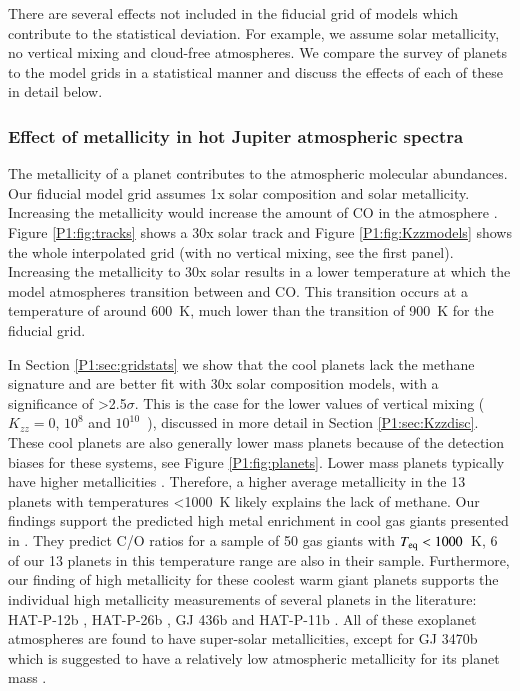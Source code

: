 There are several effects not included in the fiducial grid of models which contribute to the statistical deviation. For example, we assume solar metallicity, no vertical mixing and cloud-free atmospheres. We compare the survey of planets to the model grids in a statistical manner and discuss the effects of each of these in detail below.

\subsubsection{Effect of metallicity in hot Jupiter atmospheric spectra}
\label{P1:sec:metallicitydisc}

The metallicity of a planet contributes to the atmospheric molecular abundances. Our fiducial model grid assumes 1x solar composition and solar metallicity. Increasing the metallicity would increase the amount of CO in the atmosphere \citep[e.g.,][]{Venot2014}. Figure \ref{P1:fig:tracks} shows a 30x solar track and Figure \ref{P1:fig:Kzzmodels} shows the whole interpolated grid (with no vertical mixing, see the first panel). Increasing the metallicity to 30x solar results in a lower temperature at which the model atmospheres transition between  and CO. This transition occurs at a temperature of around 600~K, much lower than the transition of 900~K for the fiducial grid.

In Section \ref{P1:sec:gridstats} we show that the cool planets lack the methane signature and are better fit with 30x solar composition models, with a significance of >2.5$\sigma$. This is the case for the lower values of vertical mixing ($K_{zz} = 0$,  $10^8$ and $10^{10}$~\cmcms), discussed in more detail in Section \ref{P1:sec:Kzzdisc}. These cool planets are also generally lower mass planets because of the detection biases for these systems, see Figure \ref{P1:fig:planets}. Lower mass planets typically have higher metallicities \cite{Fortney2013, Welbanks2019}. Therefore, a higher average metallicity in the 13 planets with temperatures <1000~K likely explains the lack of methane. Our findings support the predicted high metal enrichment in cool gas giants presented in \citet{Espinoza2017}. They predict C/O ratios for a sample of 50 gas giants with $T_{\rm eq}<1000$~K, 6 of our 13 planets in this temperature range are also in their sample. Furthermore, our finding of high metallicity for these coolest warm giant planets supports the individual high metallicity measurements of several planets in the literature: HAT-P-12b \citep{Line2013}, HAT-P-26b \citep{Wakeford2017}, GJ 436b \citep{Morley2017} and HAT-P-11b \citep{Mansfield2018}.  All of these exoplanet atmospheres are found to have super-solar metallicities, except for GJ 3470b which is suggested to have a relatively low atmospheric metallicity for its planet mass \citep{Benneke2019}.

